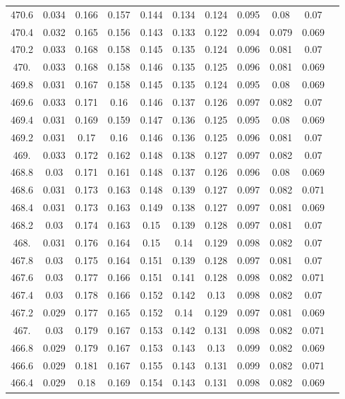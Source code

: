 \documentclass[12pt]{ctexart}
\numberwithin{equation}{section}
\begin{document}
\begin{longtable}{ccccccccccc}
470.6	&	0.034	&	0.166	&	0.157	&	0.144	&	0.134	&	0.124	&	0.095	&	0.08	&	0.07	\\
470.4	&	0.032	&	0.165	&	0.156	&	0.143	&	0.133	&	0.122	&	0.094	&	0.079	&	0.069	\\
470.2	&	0.033	&	0.168	&	0.158	&	0.145	&	0.135	&	0.124	&	0.096	&	0.081	&	0.07	\\
470.	&	0.033	&	0.168	&	0.158	&	0.146	&	0.135	&	0.125	&	0.096	&	0.081	&	0.069	\\
469.8	&	0.031	&	0.167	&	0.158	&	0.145	&	0.135	&	0.124	&	0.095	&	0.08	&	0.069	\\
469.6	&	0.033	&	0.171	&	0.16	&	0.146	&	0.137	&	0.126	&	0.097	&	0.082	&	0.07	\\
469.4	&	0.031	&	0.169	&	0.159	&	0.147	&	0.136	&	0.125	&	0.095	&	0.08	&	0.069	\\
469.2	&	0.031	&	0.17	&	0.16	&	0.146	&	0.136	&	0.125	&	0.096	&	0.081	&	0.07	\\
469.	&	0.033	&	0.172	&	0.162	&	0.148	&	0.138	&	0.127	&	0.097	&	0.082	&	0.07	\\
468.8	&	0.03	&	0.171	&	0.161	&	0.148	&	0.137	&	0.126	&	0.096	&	0.08	&	0.069	\\
468.6	&	0.031	&	0.173	&	0.163	&	0.148	&	0.139	&	0.127	&	0.097	&	0.082	&	0.071	\\
468.4	&	0.031	&	0.173	&	0.163	&	0.149	&	0.138	&	0.127	&	0.097	&	0.081	&	0.069	\\
468.2	&	0.03	&	0.174	&	0.163	&	0.15	&	0.139	&	0.128	&	0.097	&	0.081	&	0.07	\\
468.	&	0.031	&	0.176	&	0.164	&	0.15	&	0.14	&	0.129	&	0.098	&	0.082	&	0.07	\\
467.8	&	0.03	&	0.175	&	0.164	&	0.151	&	0.139	&	0.128	&	0.097	&	0.081	&	0.07	\\
467.6	&	0.03	&	0.177	&	0.166	&	0.151	&	0.141	&	0.128	&	0.098	&	0.082	&	0.071	\\
467.4	&	0.03	&	0.178	&	0.166	&	0.152	&	0.142	&	0.13	&	0.098	&	0.082	&	0.07	\\
467.2	&	0.029	&	0.177	&	0.165	&	0.152	&	0.14	&	0.129	&	0.097	&	0.081	&	0.069	\\
467.	&	0.03	&	0.179	&	0.167	&	0.153	&	0.142	&	0.131	&	0.098	&	0.082	&	0.071	\\
466.8	&	0.029	&	0.179	&	0.167	&	0.153	&	0.143	&	0.13	&	0.099	&	0.082	&	0.069	\\
466.6	&	0.029	&	0.181	&	0.167	&	0.155	&	0.143	&	0.131	&	0.099	&	0.082	&	0.071	\\
466.4	&	0.029	&	0.18	&	0.169	&	0.154	&	0.143	&	0.131	&	0.098	&	0.082	&	0.069	\\

\end{longtable}
\end{document}
